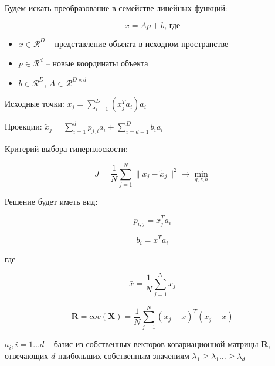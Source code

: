 \documentclass[pdf, intlimits, 9pt, unicode]{beamer}
\begin{document}
\begin{frame}
Будем искать преобразование в семействе линейных функций:\pause

$$x = A p + b \text{, где}$$

\begin{itemize}
\item $x \in \mathscr{R}^D$ -- представление объекта в исходном пространстве\pause
\item $p \in \mathscr{R}^d$ -- новые координаты объекта\pause
\item $b \in \mathscr{R}^D$, $A \in \mathscr{R}^{D \times d}$ \pause
\end{itemize}

Исходные точки: $x_j = \sum_{i=1}^{D}{(x_j^T a_i)a_i}$\pause

Проекции: ${\tilde x}_j = \sum_{i=1}^{d}{p_{j,i} a_i} + \sum_{i=d+1}^{D}{b_i a_i}$\pause

Критерий выбора гиперплоскости:

$$J = \frac{1}{N} \sum_{j=1}^{N}{\| x_j - {\tilde x}_j\|^2 } \to \operatorname*{min}_{q,z,b}$$

\end{frame}




\begin{frame}
Решение будет иметь вид:

$$p_{i,j} = x_j^T a_i$$

$$b_i = \bar{x}^T a_i$$

где

$$\bar{x} = \frac{1}{N} \sum_{j=1}^{N}{x_j}$$
\end{frame}





\begin{frame}
$$\mathbf{R} = cov(\mathbf{X}) = \frac{1}{N} \sum_{j=1}^{N}{(x_j - \bar x)^T (x_j - \bar x)}$$

$a_i, i = 1 \dots d$ -- базис из собственных векторов ковариационной матрицы $\mathbf{R}$, отвечающих $d$ наибольших собственным значениям $\lambda_1 \geq \lambda_1 \dots \geq \lambda_d$

\end{frame}
\end{document}
